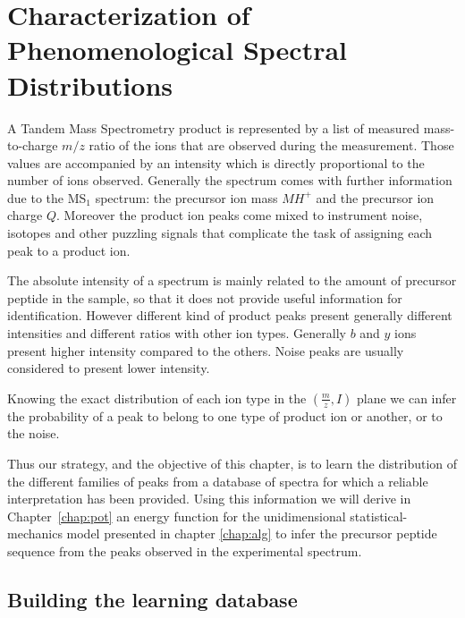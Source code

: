 \chapter{Characterization of Phenomenological Spectral Distributions}
\label{chap:db}
\nopagebreak

A Tandem Mass Spectrometry product is represented by a list of measured
mass-to-charge $m/z$ ratio of the ions that are observed during the measurement.
Those values are accompanied by an intensity which is directly proportional to
the number of ions observed.
Generally the spectrum comes with further information due to the MS$_1$ spectrum: the
precursor ion mass $MH^+$ and the precursor ion charge $Q$.
Moreover the product ion peaks come mixed to instrument noise, isotopes and
other puzzling signals 
that complicate the task of assigning each peak to a product ion.

The absolute intensity of a spectrum is mainly related to the amount of
precursor peptide in the sample, so that it does not provide useful information
for identification. However different kind of product peaks present generally
different intensities
and different ratios with other ion types.
Generally $b$ and $y$ ions present higher intensity compared to the others.
Noise peaks are usually considered to present lower intensity.

Knowing the exact distribution of each ion type in the $(\frac m z,I)$ plane we can
infer the probability of a peak to belong to one type of product ion or
another, or to the noise.

Thus our strategy, and the objective of this chapter, is to learn the distribution of
the different families of peaks from a database of spectra for which a reliable
interpretation has been provided. 
Using this information we will derive in Chapter~\ref{chap:pot} an
energy function for the unidimensional statistical-mechanics model presented in
chapter \ref{chap:alg} to infer the precursor
peptide sequence from the peaks observed in the experimental spectrum.


\section{Building the learning database}

